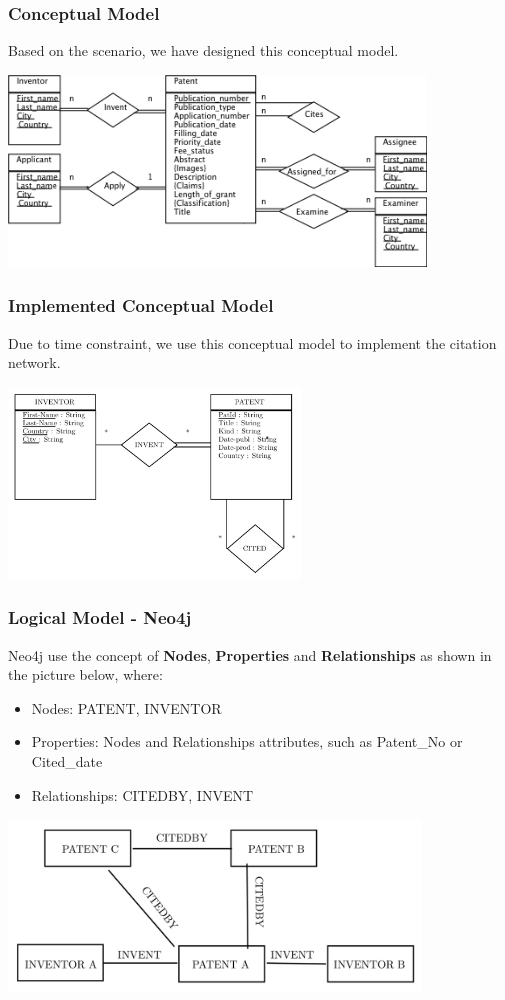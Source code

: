 \documentclass{beamer}
\begin{document}
\begin{frame}
\frametitle{Conceptual Model}
Based on the scenario, we have designed this conceptual model.
\begin{center}
\includegraphics[height=2in]{full_er.png}
\end{center}
\end{frame}

\begin{frame}
\frametitle{Implemented Conceptual Model}
Due to time constraint, we use this conceptual model to implement the citation network.
\begin{center}
\includegraphics[height=2in]{implemented_er.png}
\end{center}
\end{frame}

\begin{frame}
\frametitle{Logical Model - Neo4j}
Neo4j use the concept of \textbf{Nodes}, \textbf{Properties} and \textbf{Relationships} as shown in the picture below, where:
\begin{itemize}
\item Nodes: PATENT, INVENTOR
\item Properties: Nodes and Relationships attributes, such as Patent\_No or Cited\_date
\item Relationships: CITEDBY, INVENT
\end{itemize}
\begin{center}
\includegraphics[height=1.8in]{neo4j.png}
\end{center}
\end{frame}
\end{document}

